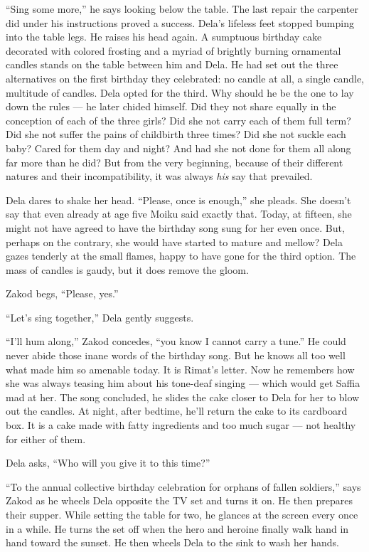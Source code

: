 \documentclass[twoside,11pt,openany]{book}
\begin{document}
``Sing some more,'' he says looking below the table. The last repair the carpenter did under
his instructions proved a success. Dela's lifeless feet stopped bumping into the table legs. He raises his head again.
A sumptuous birthday cake decorated with colored frosting and a myriad of brightly burning ornamental candles stands on
the table between him and Dela. He had set out the three alternatives on the first birthday they celebrated: no candle
at all, a single candle, multitude of candles.  Dela opted for the third. Why should he be the one to lay down the
rules --- he later chided himself. Did they not share equally in the conception of each of the three girls? Did she not
carry each of them full term? Did she not suffer the pains of childbirth three times? Did she not suckle each baby?
Cared for them day and night? And had she not done for them all along far more than he did? But from the very
beginning, because of their different natures and their incompatibility, it was always \textit{his} say that
prevailed.

Dela dares to shake her head. ``Please, once is enough,'' she pleads. She doesn't say that
even already at age five Moiku said exactly that. Today, at fifteen, she might not have agreed to have the birthday
song sung for her even once. But, perhaps on the contrary, she would have started to mature and mellow? Dela gazes
tenderly at the small flames, happy to have gone for the third option. The mass of candles is gaudy, but it does
remove the gloom.

Zakod begs, ``Please, yes.''

``Let's sing together,'' Dela gently suggests.

``I'll hum along,'' Zakod concedes, ``you know I cannot carry a
tune.'' He could never abide those inane words of the birthday song. But he knows all too well what made
him so amenable today. It is Rimat's letter. Now he remembers how she was always teasing him about his tone-deaf
singing --- which would get Saffia mad at her.  The song concluded, he slides the cake closer to Dela for her to blow
out the candles.  At night, after bedtime, he'll return the cake to its cardboard box. It is a cake made with fatty
ingredients and too much sugar --- not healthy for either of them.

Dela asks, ``Who will you give it to this time?''

``To the annual collective birthday celebration for orphans of fallen soldiers,'' says
Zakod as he wheels Dela opposite the TV set and turns it on. He then prepares their supper. While setting the table for
two, he glances at the screen every once in a while. He turns the set off when the hero and heroine finally walk hand
in hand toward the sunset. He then wheels Dela to the sink to wash her hands.
\end{document}
